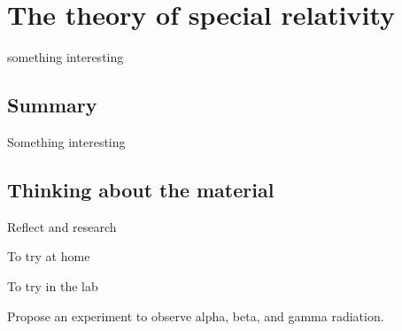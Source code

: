 \chapter{The theory of special relativity}
\label{chap:specialrelativity}
 \vspace{1cm}
\begin{learningObjectives}
\item something interesting
\end{learningObjectives}

\section{}



\newpage
\section{Summary}
\vspace{2cm}
\begin{chapterSummary}
\item Something interesting
\end{chapterSummary}


\newpage
\section{Thinking about the material}

\begin{chapteractivity}{Reflect and research}
	{
		\item 
	}
\end{chapteractivity}

\begin{chapteractivity}{To try at home}
	{
		\item 
	}
\end{chapteractivity}

\begin{chapteractivity}{To try in the lab}
	{
		\item Propose an experiment to observe alpha, beta, and gamma radiation.
	}
\end{chapteractivity}
